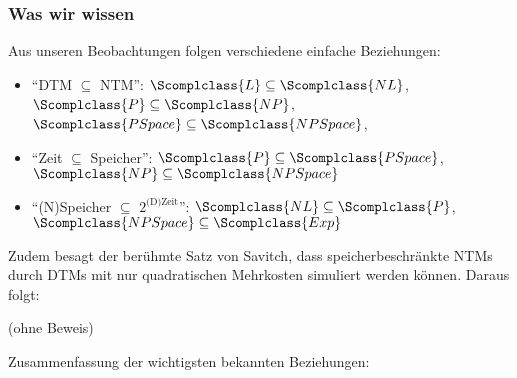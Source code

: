 \documentclass[aspectratio=1610,onlymath]{beamer}
\begin{document}
\begin{frame}\frametitle{Was wir wissen}

Aus unseren Beobachtungen folgen verschiedene einfache Beziehungen:
\begin{itemize}
\item \alert{"`DTM $\subseteq$ NTM"':}
	$\Scomplclass{L}\subseteq \Scomplclass{NL}$,
	$\Scomplclass{P}\subseteq \Scomplclass{NP}$,
	$\Scomplclass{PSpace}\subseteq \Scomplclass{NPSpace}$,
\item \alert{"`Zeit $\subseteq$ Speicher"':}
	$\Scomplclass{P}\subseteq \Scomplclass{PSpace}$,
	$\Scomplclass{NP}\subseteq \Scomplclass{NPSpace}$
\item \alert{"`(N)Speicher $\subseteq$ $2^{\text{(D)Zeit}}$"':}
	$\Scomplclass{NL}\subseteq \Scomplclass{P}$,
	$\Scomplclass{NPSpace}\subseteq \Scomplclass{Exp}$
\end{itemize}\bigskip\pause

Zudem besagt der berühmte \alert{Satz von Savitch}, dass speicherbeschränkte NTMs durch DTMs mit nur quadratischen Mehrkosten simuliert werden können. Daraus folgt:


(ohne Beweis)\bigskip\pause

Zusammenfassung der wichtigsten bekannten Beziehungen:
\theobox{
\[\Scomplclass{L}\subseteq\Scomplclass{NL}\subseteq \Scomplclass{P}\subseteq\Scomplclass{NP}\subseteq\Scomplclass{PSpace}= \Scomplclass{NPSpace}\subseteq \Scomplclass{Exp}\subseteq \Scomplclass{NExp}\]
\vspace{-2.5ex}
}

\end{frame}
\end{document}
